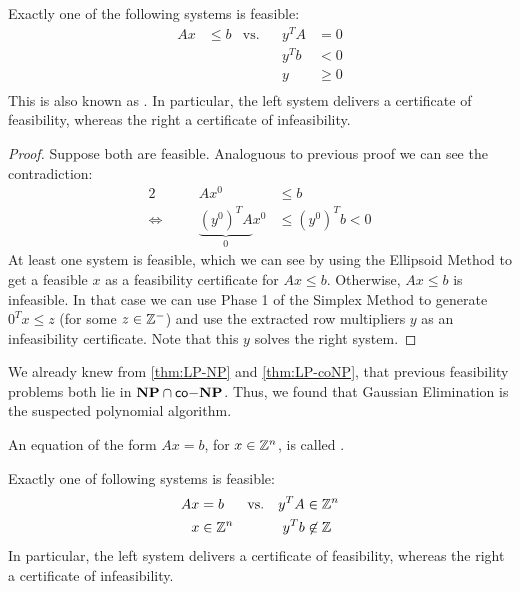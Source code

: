 \begin{theorem}
    \label{thm:farkas}
    Exactly one of the following systems is feasible:
    \begin{align*}
        Ax & \leq b & \text{vs.} &  & y^TA & =0     \\
           &        &            &  & y^Tb & <0     \\
           &        &            &  & y    & \geq 0 \\
    \end{align*}
    This is also known as .
    In particular, the left system delivers a certificate of feasibility, whereas the right a certificate of infeasibility.
\end{theorem}
\begin{proof}
    Suppose both are feasible. Analoguous to previous proof we can see the contradiction:
    \begin{alignat*}{2}
                              &  & Ax^0                        & \leq b            \\
        \Leftrightarrow \quad &  & \underbrace{(y^0)^TA}_0 x^0 & \leq (y^0)^Tb < 0
    \end{alignat*}
    At least one system is feasible, which we can see by using the Ellipsoid Method to get a feasible $x$ as a feasibility certificate for $Ax \leq b$. Otherwise, $Ax\leq b$ is infeasible.
    In that case we can use Phase 1 of the Simplex Method to generate $0^Tx \leq z$ (for some $z \in \mathbb{Z}^-$) and use the extracted row multipliers $y$ as an infeasibility certificate.
    Note that this $y$ solves the right system.
\end{proof}
\begin{conclusion}
    We already knew from \autoref{thm:LP-NP} and \autoref{thm:LP-coNP}, that previous feasibility problems both lie in $\mathbf{NP} \cap \mathsf{co-}\mathbf{NP}$.
    Thus, we found that Gaussian Elimination is the suspected polynomial algorithm.
\end{conclusion}
\begin{definition}
    An equation of the form $Ax=b$, for $x \in \mathbb{Z}^n$, is called .
\end{definition}
\begin{theorem}
    Exactly one of following systems is feasible:
    \begin{align*}
        Ax & = b             & \text{vs.} &  & y^TA & \in \mathbb{Z}^n    \\
        x  & \in \mathbb{Z}^n &            &  & y^Tb & \not \in \mathbb{Z} \\
    \end{align*}
    In particular, the left system delivers a certificate of feasibility, whereas the right a certificate of infeasibility.
\end{theorem}
